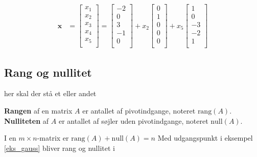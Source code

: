 \begin{eks}
\begin{align*}
    \mathbf{x} &= \begin{bmatrix}
           x_{1} \\
           x_{2} \\
           x_{3} \\
           x_{4} \\
           x_{5} \\
         \end{bmatrix} 
         = \begin{bmatrix}
           -2 \\
           0 \\
           3 \\
           -1 \\
           0 \\
         \end{bmatrix}
         +x_2 \begin{bmatrix}
           0 \\
           1 \\
           0 \\
           0 \\
           0 \\
         \end{bmatrix}
         +x_5 \begin{bmatrix}
           1 \\
           0 \\
           -3 \\
           -2 \\
           1 \\
         \end{bmatrix}
  \end{align*} 
%
\label{eks_gauss}
%
%
\end{eks}
%
%
\subsection{Rang og nullitet}
% 
her skal der stå et eller andet
%
\begin{defn}{}{}
\textbf{Rangen} af en matrix $A$ er antallet af pivotindgange, noteret $\text{rang}(A)$. \\
\textbf{Nulliteten} af $A$ er antallet af søjler uden pivotindgange, noteret $\text{null}(A)$.
\end{defn}
%
I en $m \times n$-matrix er $\text{rang}(A)+\text{null}(A)=n$
%
Med udgangspunkt i eksempel \ref{eks_gauss} bliver rang og nullitet i 

